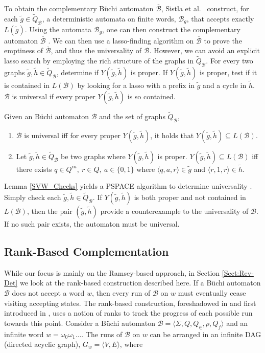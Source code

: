 \documentclass{LMCS}
\newcommand{\zug}[1]{\langle #1  \rangle}
\newcommand\buchi{B\"uchi }
\newcommand{\B}{{\mathcal B}}
\renewcommand{\graph}{\widetilde}
\newcommand{\Y}[2]{\ensuremath{Y({\graph{#1},\graph{#2}})}}
\begin{document}
To obtain the complementary \buchi automaton $\overline{\B}$,  Sistla et al.~
construct, for each $\graph{g}\in\graph{Q}_\B$, a deterministic automata on
finite words, $\B_g$, that accepts exactly $L(\graph{g})$. Using the automata $\B_g$, one can then
construct the complementary automaton $\overline{\B}$ \cite{SVW85}. We can then
use a lasso-finding algorithm on $\overline{\B}$ to prove the emptiness of
$\overline{\B}$, and thus the universality of $\B$.  However, we can avoid an
explicit lasso search by employing the rich structure of the graphs in
$\graph{Q}_\B$. For every two graphs $\graph{g}, \graph{h} \in \graph{Q}_\B$,
determine if $\Y{g}{h}$ is proper.  If $\Y{g}{h}$ is proper, test if it is
contained in $L(\B)$ by looking for a lasso with a prefix in $\graph{g}$ and a
cycle in $\graph{h}$.  $\B$ is universal if every proper $\Y{g}{h}$ is so
contained. 


\begin{lem}\label{SVW_Checks}{\rm \cite{SVW85}}
Given an \buchi automaton $\B$ and the set of graphs $\graph{Q}_\B$,
\begin{enumerate}[\em(1)]
\item $\B$ is universal iff for every proper $\Y{g}{h}$, it holds that $\Y{g}{h} \subseteq L(\B)$.
\item Let $\graph{g}, \graph{h} \in \graph{Q}_\B$ be two graphs where $\Y{g}{h}$
is proper. $\Y{g}{h} \subseteq L(\B)$ iff there exists $q \in Q^{in},~ r \in Q,~ a
\in \{0,1\}$ where $\zug{q,a,r} \in \graph{g} $ and $\zug{r,1,r} \in
\graph{h}$.  
\end{enumerate}
\end{lem}

Lemma \ref{SVW_Checks} yields a PSPACE algorithm to determine universality
\cite{SVW85}.  Simply check each $\graph{g}, \graph{h} \in \graph{Q}_\B$.  If
$\Y{g}{h}$ is both proper and not contained in $L(\B)$, then the pair
$(\graph{g}, \graph{h})$ provide a counterexample to the universality of
$\B$. If no such pair exists, the automaton must be universal.

\subsection{Rank-Based Complementation}\label{Rank-Based}

While our focus is mainly on the Ramsey-based approach, in Section \ref{Sect:Rev-Det} we 
look at the rank-based construction described here. If a \buchi automaton $\B$ does not accept a
word $w$, then every run of $\B$ on $w$ must eventually cease visiting accepting states.  The
rank-based construction, foreshadowed in \cite{Kla90} and first introduced in \cite{KV97b}, uses a notion of ranks to track the
progress of each possible run towards this point.  Consider a \buchi automaton $\B=\zug{\Sigma, Q,
Q_\in, \rho, Q_f}$ and an infinite word $w = \omega_0\omega_1...$. The runs of $\B$ on $w$ can be
arranged in an infinite DAG (directed acyclic graph), $G_w=\zug{V,E}$, where 
\end{document}
